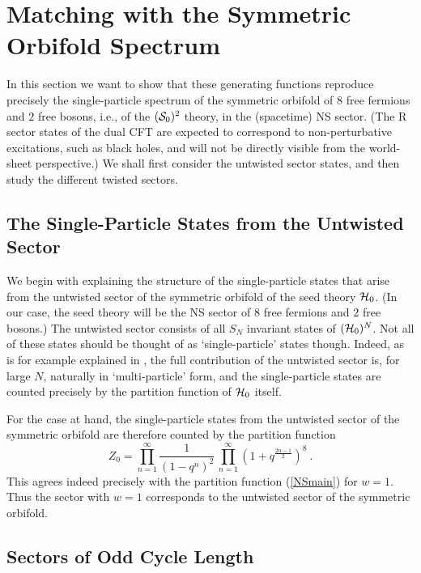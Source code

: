 \documentclass[12pt,a4paper]{article}
\newcommand{\be}{ \begin{equation}}
\newcommand{\ee}{\end{equation}}
\begin{document}
\section{Matching with the Symmetric Orbifold Spectrum}\label{sec:symorb}

In this section we want to show that these generating functions reproduce precisely the single-particle spectrum of the symmetric orbifold of $8$ free fermions and $2$ free bosons, i.e., of the $({\cal S}_0)^2$ theory, in the (spacetime) NS sector. (The R sector states of the dual CFT are expected to correspond to non-perturbative excitations, such as black holes, and will not be directly visible from the world-sheet perspective.)  We shall first consider the untwisted sector states, and then study the different twisted sectors. 

\subsection{The Single-Particle States from the Untwisted Sector}

We begin with explaining the structure of the single-particle states that arise from the untwisted sector of the symmetric orbifold of the seed theory ${\cal H}_0$. (In our case, the seed theory will be the NS sector of $8$ free fermions and $2$ free bosons.)  The untwisted sector consists of all $S_N$ invariant states of $({\cal H}_0)^N$. Not all of these states should be thought of as `single-particle' states though. Indeed, as is for example explained in \cite[Section 2]{Gaberdiel:2015mra}, the full contribution of the untwisted sector is, for large $N$, naturally in `multi-particle' form, and the single-particle states are counted precisely by the partition function of ${\cal H}_0$ itself. 

For the case at hand, the single-particle states from the untwisted sector of the symmetric orbifold are therefore counted by the partition function 
\be
Z_0 = \prod_{n=1}^\infty \frac{1}{(1-q^{n})^2} \,  \prod_{n=1}^{\infty} (1 + q^{\frac{2n-1}{2}})^8 \ . 
\ee
This agrees indeed precisely with the partition function (\ref{NSmain}) for $w=1$. Thus the sector with $w=1$ corresponds to the untwisted sector of the symmetric orbifold.

\subsection{Sectors of Odd Cycle Length}\label{sec:symorbodd}
\end{document}
